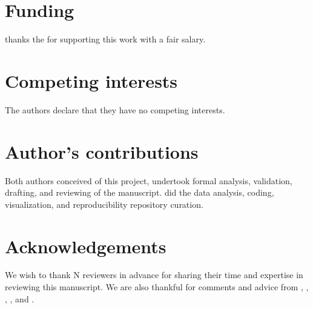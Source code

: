 \documentclass{bmcart}
\begin{document}
\begin{backmatter}

\section*{Funding}
   thanks the  for supporting this work with a fair salary. 
  
\section*{Competing interests}
  The authors declare that they have no competing interests.

\section*{Author's contributions}
  Both authors conceived of this project, undertook formal analysis, validation, drafting, and reviewing of the manuscript.  did the data analysis, coding, visualization, and reproducibility repository curation.

\section*{Acknowledgements}
  We wish to thank N reviewers in advance for sharing their time and expertise in reviewing this manuscript. We are also thankful for comments and advice from , , , , and .



\end{backmatter}
\end{document}
